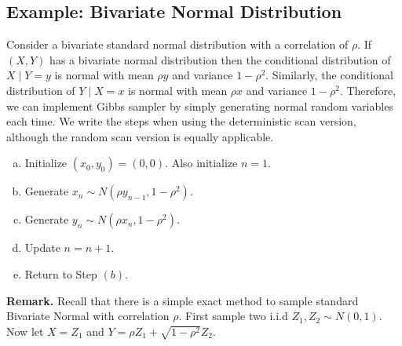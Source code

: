 \documentclass[11pt]{elegantbook}
\begin{document}
\subsection{Example: Bivariate Normal Distribution}
Consider a bivariate standard normal distribution with a correlation of $\rho$. If $(X, Y)$ has a bivariate normal distribution then the conditional distribution of $X \mid Y=y$ is normal with mean $\rho y$ and variance $1-\rho^2$. Similarly, the conditional distribution of $Y \mid X=x$ is normal with mean $\rho x$ and variance $1-\rho^2$. Therefore, we can implement Gibbs sampler by simply generating normal random variables each time. We write the steps when using the deterministic scan version, although the random scan version is equally applicable.
\begin{enumerate}[(a)]
    \item Initialize $\left(x_0, y_0\right)=(0,0)$. Also initialize $n=1$.
    \item Generate $x_n \sim N\left(\rho y_{n-1}, 1-\rho^2\right)$.
    \item Generate $y_n \sim N\left(\rho x_n, 1-\rho^2\right)$.
    \item Update $n=n+1$.
    \item Return to Step $(b)$.
\end{enumerate}
\textbf{Remark.} Recall that there is a simple exact method to sample standard Bivariate Normal with correlation $\rho$. First sample two i.i.d $Z_1, Z_2 \sim N(0,1)$. Now let $X=Z_1$ and $Y=\rho Z_1+\sqrt{1-\rho^2} Z_2$.
\end{document}
